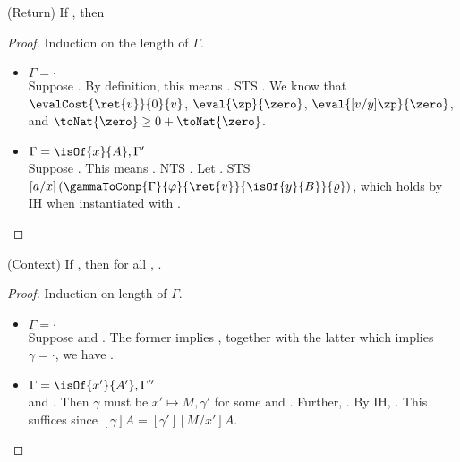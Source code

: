 \begin{lemma}\textnormal{(Return)}\label{lemma:ret}
If , then 
\end{lemma}

\begin{proof}
Induction on the length of $\Gamma$.
\begin{itemize}
    \item $\Gamma = \cdot$\\
    Suppose . By definition, this means . STS 
    . We know that 
    $\evalCost{\ret{v}}{0}{v}$, $\eval{\zp}{\zero}$, $\eval{[v/y]\zp}{\zero}$, and 
    $\toNat{\zero} \ge 0 + \toNat{\zero}$.
    \item $\Gamma = \isOf{x}{A},\Gamma'$\\
    Suppose . This means 
    . 
    NTS . Let
    . STS $[a/x]\left(\gammaToComp{\Gamma}{\varphi}{\ret{v}}{\isOf{y}{B}}{\varrho}\right)$, which 
    holds by IH when instantiated with .
\end{itemize}
\end{proof}

\begin{lemma}\textnormal{(Context)}\label{lemma:ctx}
If , then for all \isSub{\gamma}{\Gamma}, .
\end{lemma}

\begin{proof}
Induction on length of $\Gamma$.
\begin{itemize}
    \item $\Gamma = \cdot$\\
    Suppose  and \isSub{\gamma}{\cdot}. The former implies ,
    together with the latter which implies $\gamma = \cdot$, we have .
    \item $\Gamma = \isOf{x'}{A'},\Gamma''$\\
     and . 
    Then $\gamma$ must 
    be $x' \mapsto M, \gamma'$ for some  and . 
    Further, . By IH,
    . This suffices since $[\gamma]A = [\gamma'][M/x']A$.
\end{itemize}
\end{proof}

